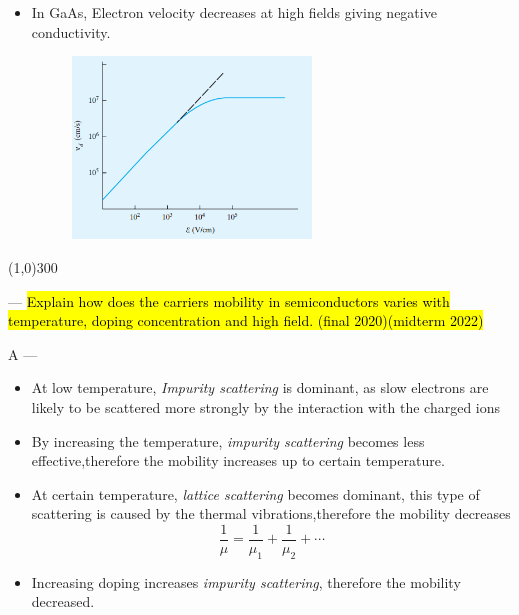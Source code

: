 \documentclass[12pt,a4paper]{article}
\newcounter{question}
\newcommand\Que[1]{
   \line(1,0){300}
   \leavevmode\par
   \stepcounter{question}
   \noindent
   \fbox{\thequestion. Q} --- \hl{#1}\par}
\newcommand\Ans[2][]{%
    \leavevmode\par\noindent
   {\leftskip16pt
    A --- \textbf{#1}#2\par}}
\begin{document}
\begin{large}
{\begin{itemize}
\item In GaAs, Electron velocity decreases at high fields giving negative conductivity. 

\begin{figure}[H] 
	\centering
	\includegraphics[width = 0.6\textwidth]{vd saturation}
	\label{fig:vd saturation}
\end{figure}
\end{itemize}
}\Que{
Explain how does the carriers mobility in semiconductors varies with temperature, doping concentration and high field. \hfill (final 2020)(midterm 2022)
}
\Ans{
\begin{itemize}
\item At low temperature, \emph{Impurity scattering} is dominant, as slow electrons are likely to be scattered more strongly by the interaction with the charged ions

\item By increasing the temperature, \emph{impurity scattering} becomes less effective,therefore the mobility increases up to certain temperature.

\item At certain temperature, \emph{lattice scattering} becomes dominant, this type of scattering is caused by the thermal vibrations,therefore the mobility decreases $$\frac{1}{\mu} = \frac{1}{\mu_1} + \frac{1}{\mu_2} + \cdots $$

\item Increasing doping increases \emph{impurity scattering}, therefore the mobility decreased.


\end{itemize}}
\end{large}
\end{document}

